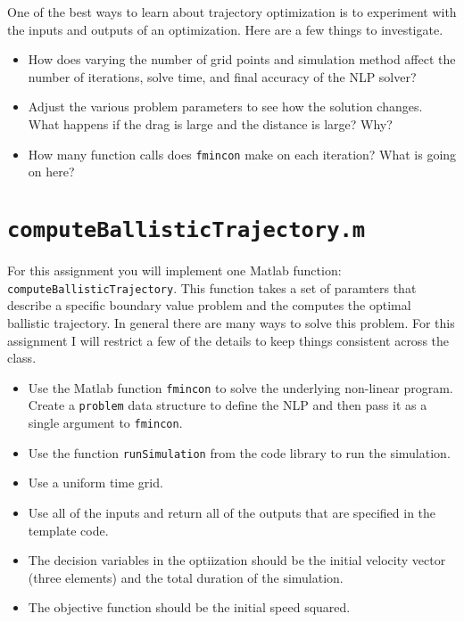 One of the best ways to learn about trajectory optimization is to experiment with
the inputs and outputs of an optimization.
Here are a few things to investigate.
\vspace{-0.0em} \begin{itemize}  \setlength\itemsep{0em} \setlength\itemindent{18pt}
\item How does varying the number of grid points and simulation method affect the
      number of iterations, solve time, and final accuracy of the NLP solver?
\item Adjust the various problem parameters to see how the solution changes.
      What happens if the drag is large and the distance is large? Why?
\item How many function calls does \texttt{fmincon} make on each iteration?
      What is going on here?
\end{itemize}

\pagebreak
\section*{\texttt{computeBallisticTrajectory.m}}

For this assignment you will implement one Matlab function: \texttt{computeBallisticTrajectory}.
This function takes a set of paramters that describe a specific boundary value problem
and the computes the optimal ballistic trajectory.
In general there are many ways to solve this problem.
For this assignment I will restrict a few of the details to keep things consistent across the class.
\vspace{-0.6em} \begin{itemize}  \setlength\itemsep{0em}
  \item Use the Matlab function \texttt{fmincon} to solve the underlying non-linear program.
        Create a \texttt{problem} data structure to define the NLP and
        then pass it as a single argument to \texttt{fmincon}.
  \item Use the function \texttt{runSimulation} from the code library to run the simulation.
  \item Use a uniform time grid.
  \item Use all of the inputs and return all of the outputs that are specified in the template code.
  \item The decision variables in the optiization should be the initial velocity vector (three elements)
        and the total duration of the simulation.
  \item The objective function should be the initial speed squared.
\end{itemize}


